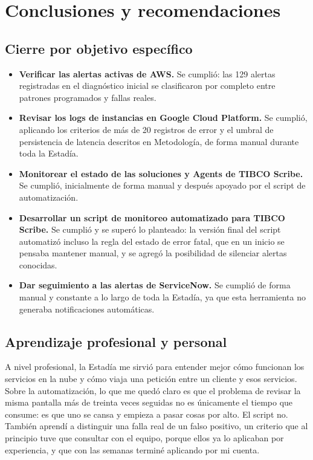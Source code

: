 \section{Conclusiones y recomendaciones}
\label{ch:conclusiones}

\subsection{Cierre por objetivo específico}
\label{sec:cierre_objetivos}

\begin{itemize}
    \item \textbf{Verificar las alertas activas de AWS.} Se cumplió: las 129 alertas registradas en el diagnóstico inicial se clasificaron por completo entre patrones programados y fallas reales.
    \item \textbf{Revisar los logs de instancias en Google Cloud Platform.} Se cumplió, aplicando los criterios de más de 20 registros de error y el umbral de persistencia de latencia descritos en Metodología, de forma manual durante toda la Estadía.
    \item \textbf{Monitorear el estado de las soluciones y Agents de TIBCO Scribe.} Se cumplió, inicialmente de forma manual y después apoyado por el script de automatización.
    \item \textbf{Desarrollar un script de monitoreo automatizado para TIBCO Scribe.} Se cumplió y se superó lo planteado: la versión final del script automatizó incluso la regla del estado de error fatal, que en un inicio se pensaba mantener manual, y se agregó la posibilidad de silenciar alertas conocidas.
    \item \textbf{Dar seguimiento a las alertas de ServiceNow.} Se cumplió de forma manual y constante a lo largo de toda la Estadía, ya que esta herramienta no generaba notificaciones automáticas.
\end{itemize}

\subsection{Aprendizaje profesional y personal}
\label{sec:aprendizaje}

A nivel profesional, la Estadía me sirvió para entender mejor cómo funcionan los servicios en la nube y cómo viaja una petición entre un cliente y esos servicios. Sobre la automatización, lo que me quedó claro es que el problema de revisar la misma pantalla más de treinta veces seguidas no es únicamente el tiempo que consume: es que uno se cansa y empieza a pasar cosas por alto. El script no. También aprendí a distinguir una falla real de un falso positivo, un criterio que al principio tuve que consultar con el equipo, porque ellos ya lo aplicaban por experiencia, y que con las semanas terminé aplicando por mi cuenta.

